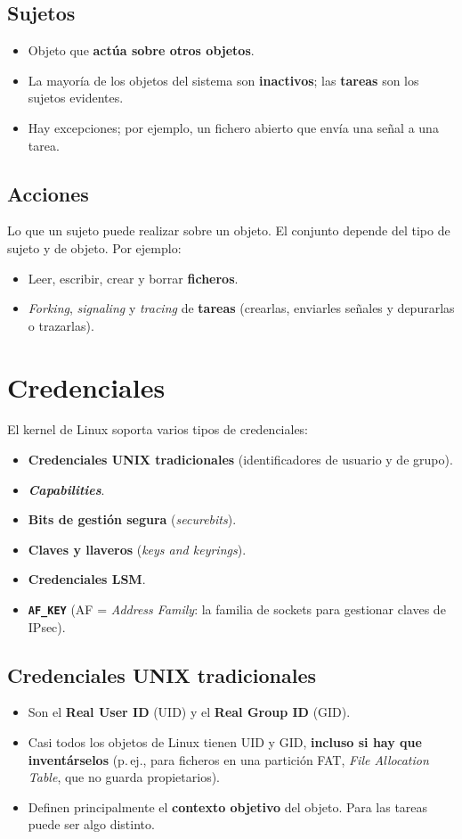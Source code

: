 \documentclass[11pt,a4paper]{report}
\begin{document}
\subsection{Sujetos}
\begin{itemize}
  \item Objeto que \textbf{actúa sobre otros objetos}.
  \item La mayoría de los objetos del sistema son \textbf{inactivos}; las \textbf{tareas} son los sujetos evidentes.
  \item Hay excepciones; por ejemplo, un fichero abierto que envía una señal a una tarea.
\end{itemize}
 
\subsection{Acciones}
Lo que un sujeto puede realizar sobre un objeto. El conjunto depende del tipo de sujeto y de objeto. Por ejemplo:
\begin{itemize}
  \item Leer, escribir, crear y borrar \textbf{ficheros}.
  \item \emph{Forking}, \emph{signaling} y \emph{tracing} de \textbf{tareas} (crearlas, enviarles señales y depurarlas o trazarlas).
\end{itemize}
 
\section{Credenciales}
 
El kernel de Linux soporta varios tipos de credenciales:
\begin{itemize}
  \item \textbf{Credenciales UNIX tradicionales} (identificadores de usuario y de grupo).
  \item \textbf{\emph{Capabilities}}.
  \item \textbf{Bits de gestión segura} (\emph{securebits}).
  \item \textbf{Claves y llaveros} (\emph{keys and keyrings}).
  \item \textbf{Credenciales LSM}.
  \item \textbf{\texttt{AF\_KEY}} (AF = \emph{Address Family}: la familia de sockets para gestionar claves de IPsec).
\end{itemize}
 
\subsection{Credenciales UNIX tradicionales}
\begin{itemize}
  \item Son el \textbf{Real User ID} (UID) y el \textbf{Real Group ID} (GID).
  \item Casi todos los objetos de Linux tienen UID y GID, \textbf{incluso si hay que inventárselos} (p.\,ej., para ficheros en una partición FAT, \emph{File Allocation Table}, que no guarda propietarios).
  \item Definen principalmente el \textbf{contexto objetivo} del objeto. Para las tareas puede ser algo distinto.
\end{itemize}
 
\end{document}
